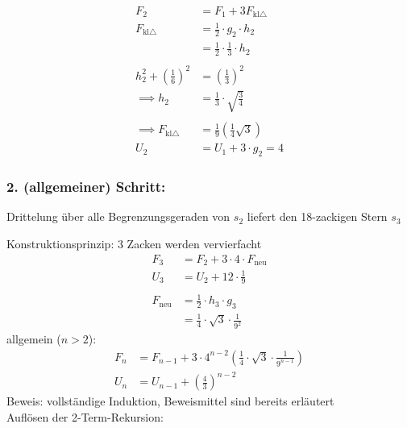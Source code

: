 \begin{center}
\end{center}

\begin{align*}
    F_2 &= F_1 + 3 F_{\text{kl} \triangle} \\
    F_{\text{kl} \triangle} &= \frac{1}{2} \cdot g_2 \cdot h_2 \\
    &= \frac{1}{2} \cdot \frac{1}{3} \cdot h_2 \\
\\
    h_2^2 + \left( \frac{1}{6} \right)^2 &= \left( \frac{1}{3} \right)^2 \\
    \implies h_2 &= \frac{1}{3} \cdot \sqrt{ \frac{3}{4} } \\
\\
    \implies F_{\text{kl} \triangle} &= \frac{1}{9} \left( \frac{1}{4} \sqrt{3} \right)
\\
    U_2 &= U_1 + 3 \cdot g_2 = 4
\end{align*}

\subsubsection*{2. (allgemeiner) Schritt:}
Drittelung über alle Begrenzungsgeraden von $s_2$ liefert den 18-zackigen Stern $s_3$
%
\begin{center}
\end{center}
%
Konstruktionsprinzip: 3 Zacken werden vervierfacht
%
\begin{align*}
    F_3 &= F_2 + 3 \cdot 4 \cdot F_{\text{neu}} \\
    U_3 &= U_2 + 12 \cdot \frac{1}{9} \\
\\
    F_{\text{neu}} &= \frac{1}{2} \cdot h_3 \cdot g_3 \\
    &= \frac{1}{4} \cdot \sqrt{3} \cdot \frac{1}{9^2}
\end{align*}
%
allgemein ($n > 2$):
\begin{align*}
    F_n &= F_{n-1} + 3 \cdot 4^{n-2} \left( \frac{1}{4} \cdot \sqrt{3} \cdot \frac{1}{9^{n-1}} \right) \\
    U_n &= U_{n-1} + \left( \frac{4}{3} \right)^{n-2}
\end{align*}
%
Beweis: vollständige Induktion, Beweismittel sind bereits erläutert\\
Auflösen der 2-Term-Rekursion:

